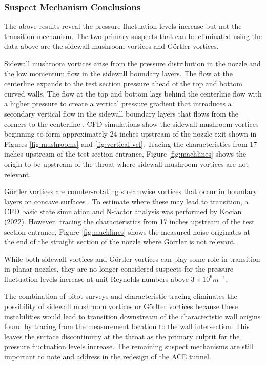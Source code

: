 \subsubsection*{Suspect Mechanism Conclusions}

The above results reveal the pressure fluctuation levels increase but not the transition mechanism. The two primary suspects that can be eliminated using the data above are the sidewall mushroom vortices and Görtler vortices.

Sidewall mushroom vortices arise from the pressure distribution in the nozzle and the low momentum flow in the sidewall boundary layers. The flow at the centerline expands to the test section pressure ahead of the top and bottom curved walls. The flow at the top and bottom lags behind the centerline flow with a higher pressure to create a vertical pressure gradient that introduces a secondary vertical flow in the sidewall boundary layers that flows from the corners to the centerline \cite{sabnis}. CFD simulations show the sidewall mushroom vortices beginning to form approximately 24 inches upstream of the nozzle exit shown in Figures \ref{fig:mushrooms} and \ref{fig:vertical-vel}. Tracing the characteristics from 17 inches upstream of the test section entrance, Figure \ref{fig:machlines} shows the origin to be upstream of the throat where sidewall mushroom vortices are not relevant.

Görtler vortices are counter-rotating streamwise vortices that occur in boundary layers on concave surfaces \cite{saric}. To estimate where these may lead to transition, a CFD basic state simulation and N-factor analysis was performed by Kocian (2022). However, tracing the characteristics from 17 inches upstream of the test section entrance, Figure \ref{fig:machlines} shows the measured noise originates at the end of the straight section of the nozzle where Görtler is not relevant.

While both sidewall vortices and Görtler vortices can play some role in transition in planar nozzles, they are no longer considered suspects for the pressure fluctuation levels increase at unit Reynolds numbers above $3 \times 10^6 m^{-1}$.

The combination of pitot surveys and characteristic tracing eliminates the possibility of sidewall mushroom vortices or Görlter vortices because these instabilities would lead to transition downstream of the characteristic wall origins found by tracing from the measurement location to the wall intersection. This leaves the surface discontinuity at the throat as the primary culprit for the pressure fluctuation levels increase. The remaining suspect mechanisms are still important to note and address in the redesign of the ACE tunnel.

